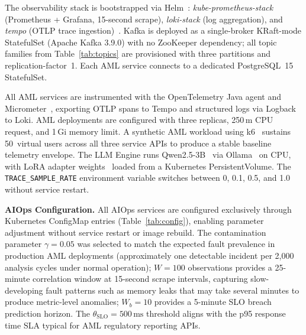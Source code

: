 \documentclass[a4paper]{lipics-v2021}
\newcommand{\mypara}[1]{{\vspace{0.1mm}\noindent\textbf{#1}}}
\begin{document}
The observability stack is bootstrapped via Helm~\cite{helm2016}:
\textit{kube-prometheus-stack} (Prometheus + Grafana, 15-second scrape), \textit{loki-stack}
(log aggregation), and \textit{tempo} (OTLP trace ingestion)~\cite{prometheus2015,loki2019,tempo2022}.
Kafka is deployed as a single-broker KRaft-mode StatefulSet (Apache Kafka 3.9.0)
with no ZooKeeper dependency; all topic families from Table~\ref{tab:topics} are
provisioned with three partitions and replication-factor~1. Each AML service connects
to a dedicated PostgreSQL~15 StatefulSet.

All AML services are instrumented with the OpenTelemetry Java agent and
Micrometer~\cite{micrometer2018}, exporting OTLP spans to Tempo and structured logs
via Logback~\cite{logback2006} to Loki. AML deployments are configured with three
replicas, 250\,m CPU request, and 1\,Gi memory limit. A synthetic AML workload using
k6~\cite{k62017} sustains 50~virtual users across all three service APIs to produce
a stable baseline telemetry envelope. The LLM Engine runs Qwen2.5-3B~\cite{qwen2024}
via Ollama~\cite{ollama2023} on CPU, with LoRA adapter weights~\cite{hu2022lora}
loaded from a Kubernetes PersistentVolume. The \texttt{TRACE\_SAMPLE\_RATE}
environment variable switches between 0, 0.1, 0.5, and 1.0 without service restart.

\mypara{AIOps Configuration.}
All AIOps services are configured exclusively through Kubernetes ConfigMap entries
(Table~\ref{tab:config}), enabling parameter adjustment without service restart or
image rebuild. The contamination parameter $\gamma{=}0.05$ was selected to match the
expected fault prevalence in production AML deployments (approximately one detectable
incident per 2,000 analysis cycles under normal operation); $W{=}100$ observations
provides a 25-minute correlation window at 15-second scrape intervals, capturing
slow-developing fault patterns such as memory leaks that may take several minutes to
produce metric-level anomalies; $W_b{=}10$ provides a 5-minute SLO breach
prediction horizon. The $\theta_{\text{SLO}}{=}500\,\text{ms}$ threshold aligns
with the p95 response time SLA typical for AML regulatory reporting APIs.
\end{document}
